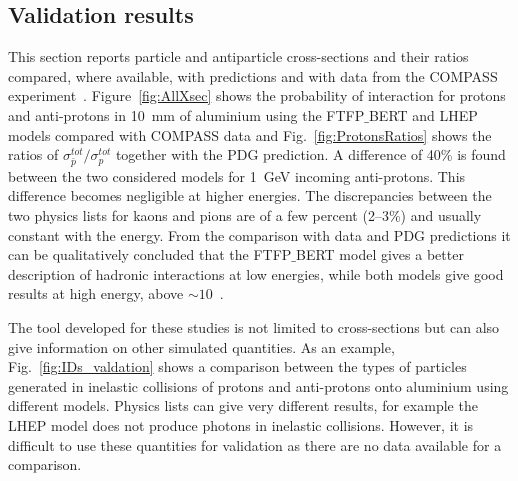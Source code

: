 \subsection{Validation results}

This section reports particle and antiparticle cross-sections and their ratios
compared, where available, with predictions and with data from the COMPASS experiment~\cite{Abbon:2007pq}.
%
Figure~\ref{fig:AllXsec} shows the probability of interaction for protons and anti-protons in 10~mm of aluminium
using the FTFP$\_$BERT and LHEP models compared with COMPASS data
and Fig.~\ref{fig:ProtonsRatios} shows the ratios of $\sigma^{tot}_{\bar{p}} / \sigma^{tot}_{p}$
together with the PDG prediction. 
%
A difference of 40\% is found between the two considered models for 1~GeV incoming anti-protons.
This difference becomes negligible at higher energies. The discrepancies between the two physics lists
for kaons and pions are of a few percent (2--3\%) and usually constant with the energy. From the comparison 
with data and PDG predictions it can be qualitatively concluded that the FTFP$\_$BERT model gives a better
description of hadronic interactions at low energies, while both models give good results at high energy, above $\sim10$~\gev.

The tool developed for these studies is not limited to cross-sections but can also give information on other simulated quantities.
As an example, Fig.~\ref{fig:IDs_valdation} shows a comparison between the types of particles generated in inelastic
collisions of protons and anti-protons onto aluminium using different models. Physics lists can give very different results, 
for example the LHEP model does not produce photons in inelastic collisions. However, it is difficult to use these
quantities for validation as there are no data available for a comparison.


